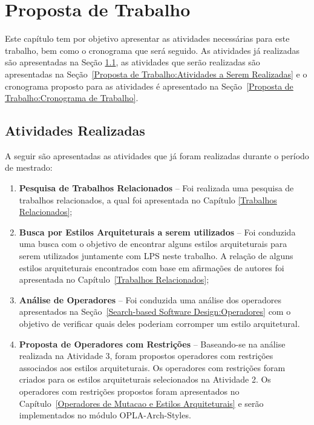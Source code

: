 \chapter{Proposta de Trabalho}
\label{Proposta de Trabalho}

Este capítulo tem por objetivo apresentar as atividades necessárias para este trabalho, bem como o cronograma que será seguido. As atividades já realizadas são apresentadas na Seção \ref{Proposta de Trabalho:Atividades Realizadas}, as atividades que serão realizadas são apresentadas na Seção~\ref{Proposta de Trabalho:Atividades a Serem Realizadas} e o cronograma proposto para as atividades é apresentado na Seção~\ref{Proposta de Trabalho:Cronograma de Trabalho}.

\section{Atividades Realizadas}
\label{Proposta de Trabalho:Atividades Realizadas}

A seguir são apresentadas as atividades que já foram realizadas durante o período de mestrado:

\begin{enumerate}
	\item \textbf{Pesquisa de Trabalhos Relacionados} -- Foi realizada uma pesquisa de trabalhos relacionados, a qual foi apresentada no Capítulo \ref{Trabalhos Relacionados};
	\item \textbf{Busca por Estilos Arquiteturais a serem utilizados} -- Foi conduzida uma busca com o objetivo de encontrar alguns estilos arquiteturais para serem utilizados juntamente com LPS neste trabalho. A relação de alguns estilos arquiteturais encontrados com base em afirmações de autores foi apresentada no Capítulo~\ref{Trabalhos Relacionados};
	\item \textbf{Análise de Operadores} -- Foi conduzida uma análise dos operadores apresentados na Seção~\ref{Search-based Software Design:Operadores} com o objetivo de verificar quais deles poderiam corromper um estilo arquitetural.
	\item \textbf{Proposta de Operadores com Restrições} -- Baseando-se na análise realizada na Atividade 3, foram propostos operadores com restrições associados aos estilos arquiteturais. Os operadores com restrições foram criados para os estilos arquiteturais selecionados na Atividade 2. Os operadores com restrições propostos foram apresentados no Capítulo~\ref{Operadores de Mutacao e Estilos Arquiteturais} e serão implementados no módulo OPLA-Arch-Styles.
\end{enumerate}

